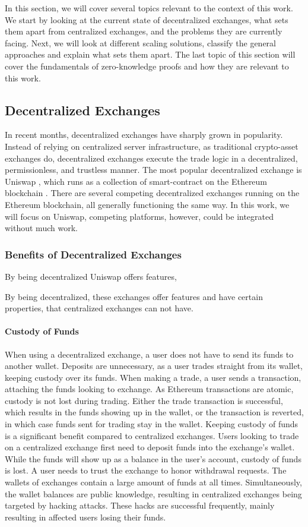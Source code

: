 \documentclass[../../thesis.tex]{subfiles}
\begin{document}
In this section, we will cover several topics relevant to the context of this work. We start by looking at the current state of decentralized exchanges, what sets them apart from centralized exchanges, and the problems they are currently facing. Next, we will look at different scaling solutions, classify the general approaches and explain what sets them apart. The last topic of this section will cover the fundamentals of zero-knowledge proofs and how they are relevant to this work.

\subsection{Decentralized Exchanges}
In recent months, decentralized exchanges have sharply grown in popularity. Instead of relying on centralized server infrastructure, as traditional crypto-asset exchanges do, decentralized exchanges execute the trade logic in a decentralized, permissionless, and trustless manner. The most popular decentralized exchange is Uniswap \cite{adams2020uniswap}, which runs as a collection of smart-contract on the Ethereum blockchain \cite{wood2014ethereum}. There are several competing decentralized exchanges running on the Ethereum blockchain, all generally functioning the same way. In this work, we will focus on Uniswap, competing platforms, however, could be integrated without much work. 

\subsubsection{Benefits of Decentralized Exchanges}

By being decentralized Uniswap offers features, 

By being decentralized, these exchanges offer features and have certain properties, that centralized exchanges can not have.

\paragraph{Custody of Funds}
When using a decentralized exchange, a user does not have to send its funds to another wallet. Deposits are unnecessary, as a user trades straight from its wallet, keeping custody over its funds. When making a trade, a user sends a transaction, attaching the funds looking to exchange. As Ethereum transactions are atomic, custody is not lost during trading. Either the trade transaction is successful, which results in the funds showing up in the wallet, or the transaction is reverted, in which case funds sent for trading stay in the wallet. Keeping custody of funds is a significant benefit compared to centralized exchanges. Users looking to trade on a centralized exchange first need to deposit funds into the exchange's wallet. While the funds will show up as a balance in the user's account, custody of funds is lost. A user needs to trust the exchange to honor withdrawal requests.  The wallets of exchanges contain a large amount of funds at all times. Simultaneously, the wallet balances are public knowledge, resulting in centralized exchanges being targeted by hacking attacks. These hacks are successful frequently, mainly resulting in affected users losing their funds. 
\end{document}
